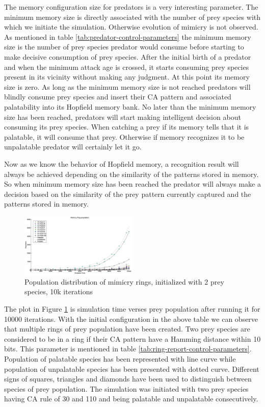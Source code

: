 \documentclass[letterpaper]{article}
\numberwithin{equation}{section}
\begin{document}
The memory configuration size for predators is a very interesting parameter. The minimum memory size is directly associated with the number of prey species with which we initiate the simulation. Otherwise evolution of mimicry is not observed. As mentioned in table \ref{tab:predator-control-parameters} the minimum memory size is the number of prey species predator would consume before starting to make decisive consumption of prey species. After the initial birth of a predator and when the minimum attack age is crossed, it starts consuming prey species present in its vicinity without making any judgment. At this point its memory size is zero. As long as the minimum memory size is not reached predators will blindly consume prey species and insert their CA pattern and associated palatability into its Hopfield memory bank. No later than the minimum memory size has been reached, predators will start making intelligent decision about consuming its prey species. When catching a prey if its memory tells that it is palatable, it will consume that prey. Otherwise if memory recognizes it to be unpalatable predator will certainly let it go.

Now as we know the behavior of Hopfield memory, a recognition result will always be achieved depending on the similarity of the patterns stored in memory. So when minimum memory size has been reached the predator will always make a decision based on the similarity of the prey pattern currently captured and the patterns stored in memory.

\begin{figure}[H]
	\centering
	\includegraphics[width=0.5\textwidth]{../tex/images/simTime10k-2Prey}
	\caption[Population distribution of mimicry rings (2 prey species, 10k iterations)]{Population distribution of mimicry rings, initialized with 2 prey species, 10k iterations}
	\label{fig:plot-2-prey}
\end{figure}

The plot in Figure \ref{fig:plot-2-prey} is simulation time verses prey population after running it for 10000 iterations. With the initial configuration in the above table we can observe that multiple rings of prey population have been created. Two prey species are considered to be in a ring if their CA pattern have a Hamming distance within 10 bits. This parameter is mentioned in table \ref{tab:ring-report-control-parameters}. Population of palatable species has been represented with line curve while population of unpalatable species has been presented with dotted curve. Different signs of squares, triangles and diamonds have been used to distinguish between species of prey population. The simulation was initiated with two prey species having CA rule of 30 and 110 and being palatable and unpalatable consecutively.
\end{document}
